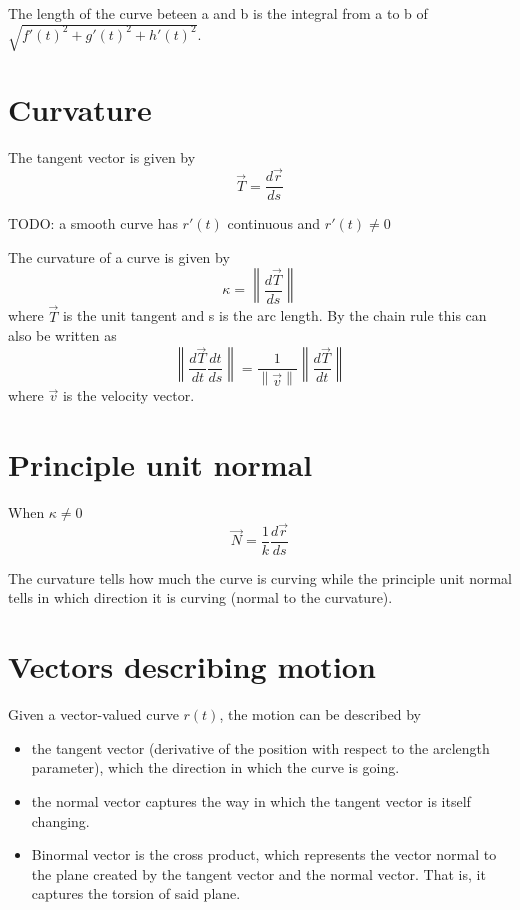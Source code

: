 \documentclass[a4paper]{article}
\begin{document}
The length of the curve beteen a and b is the integral from a to b of \(\sqrt{f'(t)^2+g'(t)^2+h'(t)^2}\).

\section{Curvature}

The tangent vector is given by
\[
    \vec{T} = \frac{d\vec{r}}{ds}
\]

TODO: a smooth curve has \(r'(t)\) continuous and \(r'(t) \neq 0\)

\newcommand\norm[1]{\left\lVert#1\right\rVert}
The curvature of a curve is given by
\[
    \kappa = \norm{\frac{d\vec{T}}{ds}}
\]
where \(\vec{T}\) is the unit tangent and s is the arc length.
By the chain rule this can also be written as
\[
    \norm{\frac{d\vec{T}}{dt}\frac{dt}{ds}} = \frac{1}{\norm{\vec{v}}}\norm{\frac{d\vec{T}}{dt}}
\]
where \(\vec{v}\) is the velocity vector.


\section{Principle unit normal}

When \(\kappa \neq 0\)
\[
    \vec{N} = \frac{1}{k}\frac{d\vec{r}}{ds}
\]

The curvature tells how much the curve is curving while the principle
unit normal tells in which direction it is curving (normal to the curvature).

\section{Vectors describing motion}

Given a vector-valued curve \(r(t)\), the motion can be described by
\begin{itemize}
    \item the tangent vector (derivative of the position
        with respect to the arclength parameter), which the direction in which the curve is going.
    \item the normal vector captures the way in which the tangent vector is itself changing.
    \item Binormal vector is the cross product, which represents the vector normal to the plane
        created by the tangent vector and the normal vector. That is, it captures the torsion of said plane.
\end{itemize}
\end{document}
